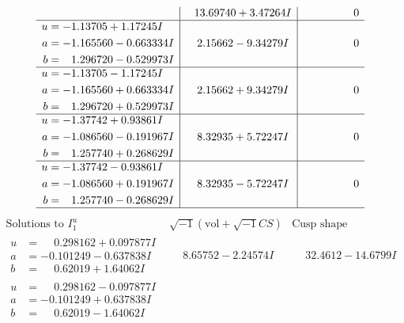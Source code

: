 \documentclass[1p]{elsarticle_modified}
\theoremstyle{definition}
\newcommand{\I}{\sqrt{-1}}
\begin{document}
$$\begin{array}{c|c|c}
 & \phantom{-}13.69740 + 3.47264 I & \phantom{-0.000000 } 0 \\ \hline\begin{aligned}
u &= -1.13705 + 1.17245 I \\
a &= -1.165560 - 0.663334 I \\
b &= \phantom{-}1.296720 - 0.529973 I\end{aligned}
 & \phantom{-}2.15662 - 9.34279 I & \phantom{-0.000000 } 0 \\ \hline\begin{aligned}
u &= -1.13705 - 1.17245 I \\
a &= -1.165560 + 0.663334 I \\
b &= \phantom{-}1.296720 + 0.529973 I\end{aligned}
 & \phantom{-}2.15662 + 9.34279 I & \phantom{-0.000000 } 0 \\ \hline\begin{aligned}
u &= -1.37742 + 0.93861 I \\
a &= -1.086560 - 0.191967 I \\
b &= \phantom{-}1.257740 + 0.268629 I\end{aligned}
 & \phantom{-}8.32935 + 5.72247 I & \phantom{-0.000000 } 0 \\ \hline\begin{aligned}
u &= -1.37742 - 0.93861 I \\
a &= -1.086560 + 0.191967 I \\
b &= \phantom{-}1.257740 - 0.268629 I\end{aligned}
 & \phantom{-}8.32935 - 5.72247 I & \phantom{-0.000000 } 0\\
 \hline 
 \end{array}$$\newpage$$\begin{array}{c|c|c}  
\text{Solutions to }I^u_{1}& \I (\text{vol} + \sqrt{-1}CS) & \text{Cusp shape}\\
 \hline 
\begin{aligned}
u &= \phantom{-}0.298162 + 0.097877 I \\
a &= -0.101249 - 0.637838 I \\
b &= \phantom{-}0.62019 + 1.64062 I\end{aligned}
 & \phantom{-}8.65752 - 2.24574 I & \phantom{-}32.4612 - 14.6799 I \\ \hline\begin{aligned}
u &= \phantom{-}0.298162 - 0.097877 I \\
a &= -0.101249 + 0.637838 I \\
b &= \phantom{-}0.62019 - 1.64062 I\end{aligned}

\end{array}$$
\end{document}
